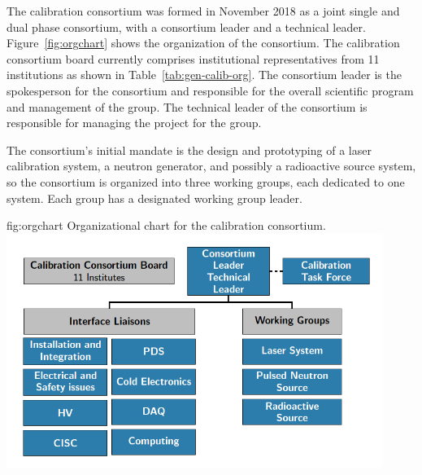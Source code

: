 
The calibration consortium was formed in November 2018 as a joint single and dual phase consortium, with a consortium leader and a technical leader. Figure~\ref{fig:orgchart} shows the organization of the consortium. The calibration consortium board currently comprises institutional representatives from 11 institutions as shown in Table~\ref{tab:gen-calib-org}. The consortium leader is the spokesperson for the consortium and responsible for the overall scientific program and management of the group. The technical leader of the consortium is responsible for managing the project for the group. 

The consortium's initial mandate is the design and prototyping of a laser calibration system, a neutron generator, and possibly a radioactive source system, so the consortium is organized into three working groups, each dedicated to one system. Each group has a designated working group leader.



\begin{dunefigure}{fig:orgchart}
{Organizational chart for the calibration consortium.}
\includegraphics[height=3.0in]{graphics/orgchart_calib_sp.png}
\end{dunefigure}


